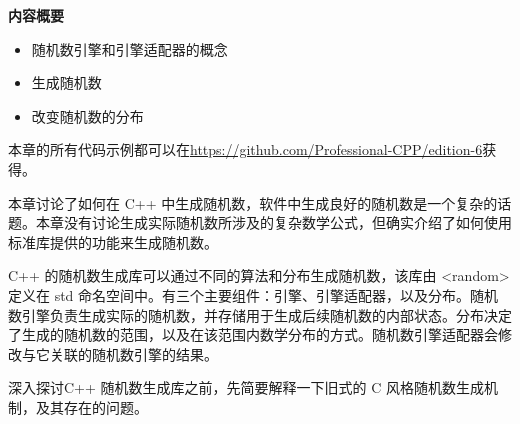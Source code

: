 \noindent
\textbf{内容概要}

\begin{itemize}
\item
随机数引擎和引擎适配器的概念

\item
生成随机数

\item
改变随机数的分布
\end{itemize}

本章的所有代码示例都可以在\url{https://github.com/Professional-CPP/edition-6}获得。

本章讨论了如何在 C++ 中生成随机数，软件中生成良好的随机数是一个复杂的话题。本章没有讨论生成实际随机数所涉及的复杂数学公式，但确实介绍了如何使用标准库提供的功能来生成随机数。

C++ 的随机数生成库可以通过不同的算法和分布生成随机数，该库由 <random> 定义在 std 命名空间中。有三个主要组件：引擎、引擎适配器，以及分布。随机数引擎负责生成实际的随机数，并存储用于生成后续随机数的内部状态。分布决定了生成的随机数的范围，以及在该范围内数学分布的方式。随机数引擎适配器会修改与它关联的随机数引擎的结果。

深入探讨C++ 随机数生成库之前，先简要解释一下旧式的 C 风格随机数生成机制，及其存在的问题。










